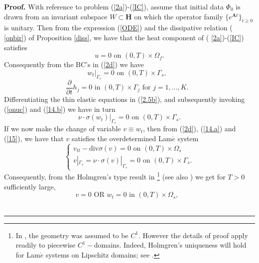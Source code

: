 \documentclass[11pt]{article}
\newenvironment{proof}[1][Proof]{\textbf{#1.} }{\ \rule{0.5em}{0.5em}}
\begin{document}
\begin{proof}
With reference to problem (\ref{2a})-(\ref{IC}), assume that initial data $%
\Phi _{0}$  is drawn from an invariant subspace $W\subset \mathbf{H}$ on
which the operator family $\{e^{\mathbf{A}t}\}_{t\geq 0}$ is unitary. Then from the expression (\ref{ODE}) and the dissipative relation (%
\ref{onbir}) of Proposition \ref{diss}, we have that the heat component of (%
\ref{2a})-(\ref{IC}) satisfies%
\begin{equation}
u=0\text{ \ \ \ \ on \ \ }(0,T)\times \Omega _{f}.  \label{onuc}
\end{equation}%
Consequently from the BC's in (\ref{2d}) we have%
\begin{equation}
w_{t}|_{\Gamma _{s}}=0\text{ \ \ on \ }(0,T)\times \Gamma _{s},\text{\ }
\label{14.a}
\end{equation}%
\begin{equation}
\frac{\partial }{\partial t}h_{j}=0\text{ \ \ in \ }(0,T)\times \Gamma _{j}%
\text{ \ \ for }j=1,...,K.\text{\ }  \label{14.b}
\end{equation}%
Differentiating the thin elastic equations in (\ref{2.5b}), and subsequently
invoking (\ref{onuc}) and (\ref{14.b}) we have in turn%
\begin{equation}
\nu \cdot \sigma (w_{t})|_{\Gamma _{s}}=0\text{ \ \ on \ }(0,T)\times \Gamma
_{s}.  \label{15}
\end{equation}%
If we now make the change of variable $v\equiv w_{t}$, then from (\ref{2d}),
(\ref{14.a}) and (\ref{15}), we have that $v$ satisfies the overdetermined
Lam$\acute{e}$ system%
\begin{equation}
\left\{ 
\begin{array}{c}
v_{tt}-\text{div}\sigma (v)=0\text{ \ \ on \ }(0,T)\times \Omega _{s} \\ 
v|_{\Gamma _{s}}=\nu \cdot \sigma (v)|_{\Gamma _{s}}=0\text{ \ \ on \ }%
(0,T)\times \Gamma _{s}.%
\end{array}%
\right.   \label{16}
\end{equation}%
Consequently, from the Holmgren's type result in \cite{Eller-Tound} \footnote{In \cite{Eller-Tound}, the geometry was assumed to be $C^1$. However the details of proof apply readily to piecewise $C^1-$domains. Indeed, Holmgren's uniqueness will hold for Lam$\acute{e}$ systems on Lipschitz domains; see \cite{Eller-3}.} (see also \cite{Eller-et-al}) we get for $T>0$ sufficiently large,%
\begin{equation}
v=0\text{ \ \ OR \ \ }w_{t}=0\text{ \ in \ }(0,T)\times \Omega _{s},\text{\ }

\end{equation}
\end{proof}
\end{document}
